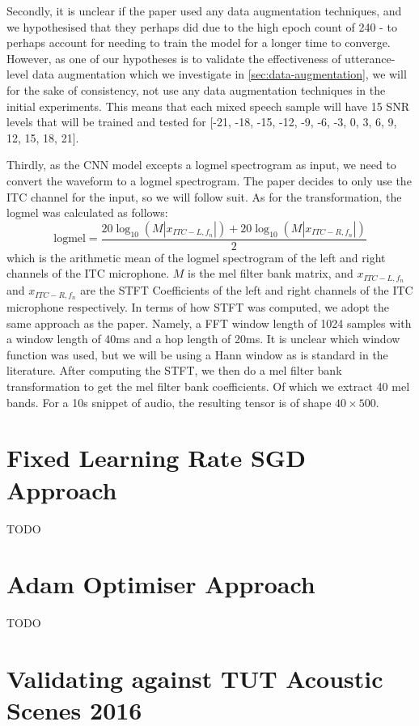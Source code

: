 \documentclass[logo,bsc,singlespacing,parskip,online]{infthesis}
\begin{document}
Secondly, it is unclear if the paper used any data augmentation techniques, and we 
hypothesised that they perhaps did due to the high epoch count of 240 - to perhaps 
account for needing to train the model for a longer time to converge. However,
as one of our hypotheses is to validate the effectiveness of utterance-level data 
augmentation which we investigate in \ref{sec:data-augmentation}, we will 
for the sake of consistency, not use any data augmentation techniques in the 
initial experiments. This means that each mixed speech sample will have 15
SNR levels that will be trained and tested for [-21, -18, -15, -12, -9, -6, -3, 0, 3, 6, 9, 12, 15, 18, 21].

Thirdly, as the CNN model excepts a logmel spectrogram as input, we need to convert the waveform
to a logmel spectrogram. The paper decides to only use the ITC channel for the input, so we 
will follow suit.
As for the transformation, the logmel was calculated as follows:
\[
\text{logmel} = \frac{20\log_{10}\left(M|x_{ITC-L, f_n}|\right) + 20\log_{10}\left(M|x_{ITC-R, f_n}|\right)}{2}
\]
which is the arithmetic mean of the logmel spectrogram of the left and right channels of the ITC microphone.
$M$ is the mel filter bank matrix, and $x_{ITC-L, f_n}$ and $x_{ITC-R, f_n}$ are
the STFT Coefficients of the left and right channels of the ITC microphone respectively.
In terms of how STFT was computed, we adopt the same approach as the paper. Namely, 
a FFT window length of 1024 samples with a window length of 40ms and a hop length of 20ms. It is 
unclear which window function was used, but we will be using a Hann window as is standard in the literature.
After computing the STFT, we then do a mel filter bank transformation to get the mel filter bank coefficients. 
Of which we extract 40 mel bands. For a 10s snippet of audio, the resulting tensor is of shape $40 \times 500$.

\section{Fixed Learning Rate SGD Approach}
TODO
\section{Adam Optimiser Approach}
TODO

\section{Validating against TUT Acoustic Scenes 2016}
\end{document}
